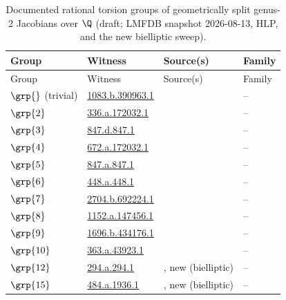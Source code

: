 \begingroup\scriptsize
\begin{longtable}{@{}l >{\raggedright\arraybackslash}p{} l l@{}}
\caption{Documented rational torsion groups of geometrically split
genus-2 Jacobians over $\Q$ (draft; LMFDB snapshot 2026-08-13, HLP,
and the new bielliptic sweep).\label{tab:splitcensus}}\\
\toprule
Group & Witness & Source(s) & Family\\
\midrule
\endfirsthead
\toprule
Group & Witness & Source(s) & Family\\
\midrule
\endhead
\bottomrule
\endlastfoot
$\grp{}$ (trivial) & \href{https://www.lmfdb.org/Genus2Curve/Q/1083/b/390963/1}{1083.b.390963.1} & \cite{LMFDB} & --\\
$\grp{2}$ & \href{https://www.lmfdb.org/Genus2Curve/Q/336/a/172032/1}{336.a.172032.1} & \cite{LMFDB} & --\\
$\grp{3}$ & \href{https://www.lmfdb.org/Genus2Curve/Q/847/d/847/1}{847.d.847.1} & \cite{LMFDB} & --\\
$\grp{4}$ & \href{https://www.lmfdb.org/Genus2Curve/Q/672/a/172032/1}{672.a.172032.1} & \cite{LMFDB} & --\\
$\grp{5}$ & \href{https://www.lmfdb.org/Genus2Curve/Q/847/a/847/1}{847.a.847.1} & \cite{LMFDB} & --\\
$\grp{6}$ & \href{https://www.lmfdb.org/Genus2Curve/Q/448/a/448/1}{448.a.448.1} & \cite{LMFDB} & --\\
$\grp{7}$ & \href{https://www.lmfdb.org/Genus2Curve/Q/2704/b/692224/1}{2704.b.692224.1} & \cite{LMFDB} & --\\
$\grp{8}$ & \href{https://www.lmfdb.org/Genus2Curve/Q/1152/a/147456/1}{1152.a.147456.1} & \cite{LMFDB} & --\\
$\grp{9}$ & \href{https://www.lmfdb.org/Genus2Curve/Q/1696/b/434176/1}{1696.b.434176.1} & \cite{LMFDB} & --\\
$\grp{10}$ & \href{https://www.lmfdb.org/Genus2Curve/Q/363/a/43923/1}{363.a.43923.1} & \cite{LMFDB} & --\\
$\grp{12}$ & \href{https://www.lmfdb.org/Genus2Curve/Q/294/a/294/1}{294.a.294.1} & \cite{LMFDB}, new (bielliptic) & --\\
$\grp{15}$ & \href{https://www.lmfdb.org/Genus2Curve/Q/484/a/1936/1}{484.a.1936.1} & \cite{LMFDB}, new (bielliptic) & --\\

\end{longtable}
